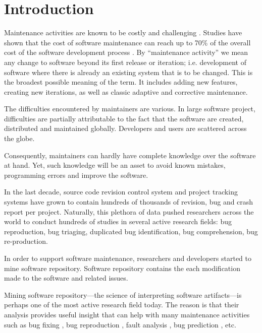 
\setcounter{page}{1}

\chapter{Introduction}

Maintenance activities are known to be costly and challenging \cite{Pressman2005}. Studies have shown that the cost of software maintenance can reach up to 70\% of the overall cost of the software development process \cite{HealthSocial2002}.
By ``maintenance activity'' we mean any change to software beyond its first release or iteration; i.e. development of software where there is already an existing system that is to be changed.
This is the broadest possible meaning of the term.
It includes adding new features, creating new iterations, as well as classic adaptive and corrective maintenance.

The difficulties encountered by maintainers are various.
In large software project, difficulties are partially attributable to the fact that the software are created, distributed and maintained globally.
Developers and users are scattered across the globe.

Consequently, maintainers can hardly have complete knowledge over the software at hand.
Yet, such knowledge will be an asset to avoid known mistakes, programming errors and improve the software.

In the last decade, source code revision control system and project tracking systems have grown to contain hundreds of thousands of revision, bug and crash report per project.
Naturally, this plethora of data pushed researchers across the world to conduct hundreds of studies in several active research fields: bug reproduction, bug triaging, duplicated bug identification, bug comprehension, bug re-production.

In order to support software maintenance, researchers and developers started to mine software repository.
Software repository contains the each modification made to the software and related issues.

Mining software repository---the science of interpreting software artifacts---is perhaps one of the most active research field today.
The reason is that their analysis provides useful insight that can help with many maintenance activities such as bug fixing \cite{Weiss2007,Saha2014}, bug reproduction \cite{Artzi2008,Jin2012,Chen2013}, fault analysis \cite{Jiang2012,Jin2013}, bug prediction \cite{Hovemeyer2007}, etc.

